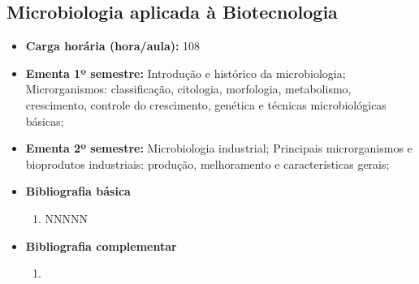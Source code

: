 \documentclass[11pt,fleqn]{book} %
\begin{document}
\newpage
\subsection{Microbiologia aplicada à Biotecnologia}\label{disc:microbiologia}
\begin{itemize}
	\item \textbf{Carga horária (hora/aula):} 108
	\item \textbf{Ementa 1º semestre:}
	Introdução e histórico da microbiologia; 
	Microrganismos: classificação, citologia, morfologia, metabolismo, crescimento, controle do crescimento, genética e técnicas microbiológicas básicas;
	\item \textbf{Ementa 2º semestre:}
	Microbiologia industrial; 
	Principais microrganismos e bioprodutos industriais: produção, melhoramento e características gerais;	
	\item \textbf{Bibliografia básica}
	\begin{enumerate}
		\item NNNNN
	\end{enumerate}
	\item \textbf{Bibliografia complementar}
	\begin{enumerate}
		\item 
	\end{enumerate}	
\end{itemize}



\newpage
\end{document}
